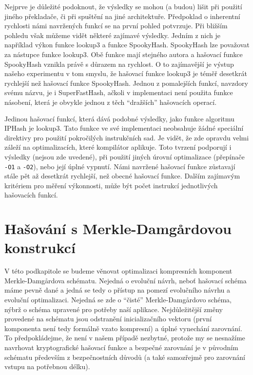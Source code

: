 Nejprve je důležité podoknout, že výsledky se mohou (a budou) lišit při použití jiného překladače, či při spuštění na jiné
architektuře. Předpoklad o inherentní rychlosti námi navržených funkcí se na první pohled potvrzuje. Při bližším pohledu však
můžeme vidět některé zajímavé výsledky. Jedním z nich je například výkon funkce lookup3 a funkce SpookyHash. SpookyHash lze
považovat za nástupce funkce lookup3. Obě funkce mají stejného autora a hašovací funkce SpookyHash vznikla právě s důrazem
na rychlost. O to zajímavější je výstup našeho experimentu v tom smyslu, že hašovací funkce lookup3 je téměř desetkrát
rychlejší než hašovací funkce SpookyHash. Jednou z pomalejších funkcí, navzdory svému názvu, je i SuperFastHash, ačkoli v
implementaci není použita funkce násobení, která je obvykle jednou z těch ``dražších'' hašovacích operací. 

Jedinou hašovací funkcí, která dává podobné výsledky, jako funkce algoritmu IPHash je lookup3. Tato funkce ve své
implementaci neobsahuje žádné speciální direktivy pro použití pokročilých instrukčních sad. Je vidět, že zde opravdu
velmi záleží na optimalizacích, které kompilátor aplikuje. Toto tvrzení podporují i výsledky (nejsou zde uvedené), při
použití jiných úrovní optimalizace (přepínače \texttt{-O1} a \texttt{-O2}), nebo její úplné vypnutí. Námi navržené hašovací
funkce zůstavají stále pět až desetkrát rychlejší, než obecné hašovací funkce. Dalším zajímavým kritériem pro měření
výkonnosti, může být počet instrukcí jednotlivých hašovacích funkcí. 

\section{Hašování s Merkle-Damg\r{a}rdovou konstrukcí}

V této podkapitole se budeme věnovat optimalizaci kompresních komponent Merkle-Damg\r{a}rdova schématu. Nejedná o evoluční návrh,
neboť hašovací schéma máme pevně dané a jedná se tedy o přístup na pomezí evolučního návrhu a evoluční optimalizaci.
Nejedná se zde o 
``čisté'' Merkle-Damg\r{a}rdovo schéma, nýbrž o schéma upravené pro potřeby naší aplikace. Nejdůležitější změny provedené
na schématu jsou odstranění inicializačního vektoru (první komponenta není tedy formálně vzato kompresní) a úplné 
vynechání zarovnání. To předpokládejme, že není v našem případě nezbytné, protože my se nesnažíme navrhovat 
kryptografické hašovací funkce a bezpečné zarovnání je v původním schématu především z bezpečnostních důvodů (a také
samozřejmě pro zarovnání vstupu na potřebnou délku).


